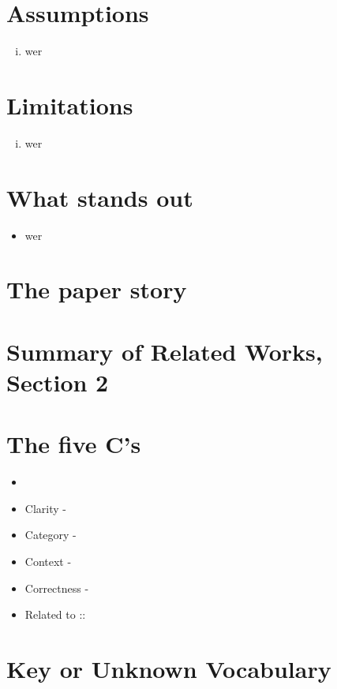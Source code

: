 \documentclass{article}
\begin{document}

\section{Assumptions}
\begin{enumerate}[(i)]
	\item wer
\end{enumerate}

\section{Limitations}
\begin{enumerate}[(i)]
	\item wer
\end{enumerate}

\section{What stands out}
\begin{itemize}
	\item wer
\end{itemize}

\section{The paper story}

\section{Summary of Related Works, Section 2}

\section{The five C's}
\begin{itemize}
	\item 
	\item Clarity - 
	\item Category -
	\item Context -
	\item Correctness - 
	\item Related to :: 
\end{itemize}


\section{Key or Unknown Vocabulary}
\begin{enumerate}[(i)]
\end{enumerate}
\end{document}

